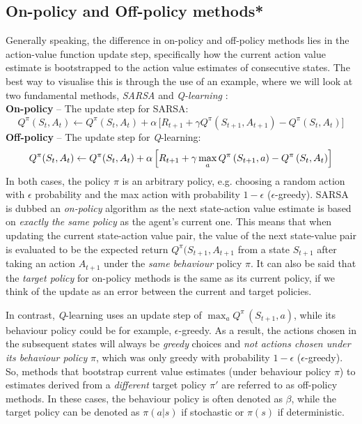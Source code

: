 \subsection{On-policy and Off-policy methods*}
\label{subsec:2_on-policy_off-policy_methods}
Generally speaking, the difference in on-policy and off-policy methods lies in the action-value function update step, specifically how the current action value estimate is bootstrapped to the action value estimates of consecutive states. 
The best way to visualise this is through the use of an example, where we will look at two fundamental methods, \textit{SARSA} \cite{suttonAndBartoBook} and \textit{Q-learning} \cite{watkins1992QLearning}: \\[5mm]
\textbf{On-policy} -- The update step for SARSA:
    \begin{equation}
        Q^\pi(S_t, A_t) \leftarrow Q^\pi(S_t, A_t) + \alpha \, \Big[
        R_{t+1} + \gamma Q^\pi(S_{t+1}, A_{t+1}) - Q^\pi(S_t, A_t)
        \Big] \label{eq:2_SARSA}
    \end{equation}
\textbf{Off-policy} -- The update step for \textit{Q}-learning:
\begin{equation}
    Q^\pi(S_t, A_t) \leftarrow Q^\pi(S_t, A_t) + \alpha \, \Big[
    R_{t+1} + \gamma \max_a Q^\pi\,(S_{t+1}, a) - Q^\pi\,(S_t, A_t) 
    \Big] \label{eq:2_Qlearning} \vspace{1mm}
\end{equation} 
In both cases, the policy $\pi$ is an arbitrary policy, e.g. choosing a random action with $\epsilon$ probability and the max action with probability $1-\epsilon$ ($\epsilon$-greedy).
SARSA is dubbed an \textit{on-policy} algorithm as the next state-action value estimate is based on \textit{exactly the same policy} as the agent's current one. This means that when updating the current state-action value pair, the value of the next state-value pair is evaluated to be the expected return $Q^\pi(S_{t+1}, A_{t+1}$ from a state $S_{t+1}$ after taking an action $A_{t+1}$ under the \textit{same} \textit{behaviour} policy $\pi$. It can also be said that the \textit{target policy} for on-policy methods is the same as its current policy, if we think of the update as an error between the current and target policies.

In contrast, \textit{Q}-learning uses an update step of $\max_a Q^\pi\,(S_{t+1}, a)$, while its behaviour policy could be for example, $\epsilon$-greedy. As a result, the actions chosen in the subsequent states will always be \textit{greedy} choices and \textit{not actions chosen under its behaviour policy} $\pi$, which was only greedy with probability $1-\epsilon$ ($\epsilon$-greedy).
So, methods that bootstrap current value estimates (under behaviour policy $\pi$) to estimates derived from a \textit{different} target policy $\pi'$ are referred to as off-policy methods. In these cases, the behaviour policy is often denoted as $\beta$, while the target policy can be denoted as $\pi(a|s)$ if stochastic or $\pi(s)$ if deterministic.

